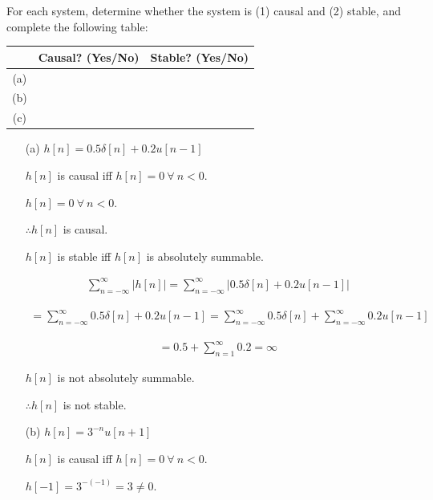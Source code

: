 \documentclass[fleqn]{article}
\begin{document}
\begin{enumerate}
\begin{enumerate}
			\end{enumerate}
			
			For each system, determine whether the system is (1) causal and (2) stable, and complete the following table:
			
			\begin{center}
				\begin{tabular}{|c|c|c|}
					\hline
					& Causal? (Yes/No) & Stable? (Yes/No) \\
					\hline
					(a) & & \\
					\hline
					(b) & & \\
					\hline
					(c) & & \\
					\hline
				\end{tabular}
			\end{center}
			
			\begin{enumerate}
				\item[(a)] $h[n] = 0.5\delta[n] + 0.2u[n-1]$
				
					$h[n]$ is causal iff $h[n] = 0\ \forall\ n < 0$.
					
					$h[n] = 0\ \forall\ n < 0$.
					
					$\therefore h[n]$ is causal.
					
					$h[n]$ is stable iff $h[n]$ is absolutely summable.
					
					\begin{align*}
						\sum_{n=-\infty}^{\infty}{|h[n]|} = \sum_{n=-\infty}^{\infty}{|0.5\delta[n] + 0.2u[n-1]|}
					\end{align*}
					
					\begin{align*}
						= \sum_{n=-\infty}^{\infty}{0.5\delta[n] + 0.2u[n-1]} = \sum_{n=-\infty}^{\infty}{0.5\delta[n]} + \sum_{n=-\infty}^{\infty}{0.2u[n-1]}
					\end{align*}
				
					\begin{align*}
						= 0.5 + \sum_{n=1}^{\infty}{0.2} = \infty
					\end{align*}
				
					$h[n]$ is not absolutely summable.
				
					$\therefore h[n]$ is not stable.
				
				\item[(b)] $h[n] = 3^{-n}u[n+1]$
				
					$h[n]$ is causal iff $h[n] = 0\ \forall\ n < 0$.
					
					$h[-1] = 3^{-(-1)} = 3 \neq 0$.
					

\end{enumerate}
\end{enumerate}
\end{document}
